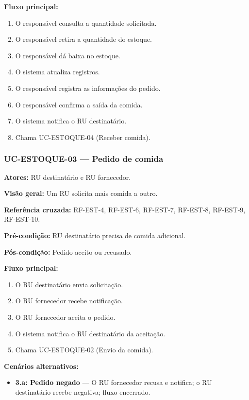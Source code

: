 \documentclass[12pt,a4paper]{article}
\begin{document}
\textbf{Fluxo principal:}
\begin{enumerate}
    \item O responsável consulta a quantidade solicitada.
    \item O responsável retira a quantidade do estoque.
    \item O responsável dá baixa no estoque.
    \item O sistema atualiza registros.
    \item O responsável registra as informações do pedido.
    \item O responsável confirma a saída da comida.
    \item O sistema notifica o RU destinatário.
    \item Chama UC-ESTOQUE-04 (Receber comida).
\end{enumerate}

\subsubsection{UC-ESTOQUE-03 — Pedido de comida}
\textbf{Atores:} RU destinatário e RU fornecedor.  

\textbf{Visão geral:} Um RU solicita mais comida a outro.  

\textbf{Referência cruzada:} RF-EST-4, RF-EST-6, RF-EST-7, RF-EST-8, RF-EST-9, RF-EST-10.  

\textbf{Pré-condição:} RU destinatário precisa de comida adicional.  

\textbf{Pós-condição:} Pedido aceito ou recusado.  

\textbf{Fluxo principal:}
\begin{enumerate}
    \item O RU destinatário envia solicitação.
    \item O RU fornecedor recebe notificação.
    \item O RU fornecedor aceita o pedido.
    \item O sistema notifica o RU destinatário da aceitação.
    \item Chama UC-ESTOQUE-02 (Envio da comida).
\end{enumerate}

\textbf{Cenários alternativos:}
\begin{itemize}
    \item \textbf{3.a: Pedido negado} — O RU fornecedor recusa e notifica; o RU destinatário recebe negativa; fluxo encerrado.
\end{itemize}
\end{document}
